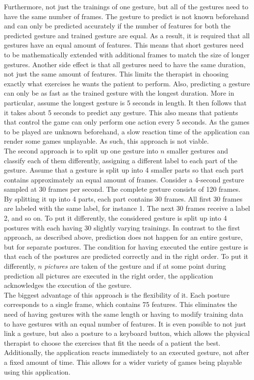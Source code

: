 Furthermore, not just the trainings of one gesture, but all of the gestures need to have the same number of frames. The gesture to predict is not known beforehand and can only be predicted accurately if the number of features for both the predicted gesture and trained gesture are equal. As a result, it is required that all gestures have an equal amount of features. This means that short gestures need to be mathematically extended with additional frames to match the size of longer gestures. Another side effect is that all gestures need to have the same duration, not just the same amount of features. This limits the therapist in choosing exactly what exercises he wants the patient to perform. Also, predicting a gesture can only be as fast as the trained gesture with the longest duration. More in particular, assume the longest gesture is 5 seconds in length. It then follows that it takes about 5 seconds to predict any gesture. This also means that patients that control the game can only perform one action every 5 seconds. As the games to be played are unknown beforehand, a slow reaction time of the application can render some games unplayable. As such, this approach is not viable.\\

The second approach is to split up one gesture into $n$ smaller gestures and classify each of them differently, assigning a different label to each part of the gesture. Assume that a gesture is split up into 4 smaller parts so that each part contains approximately an equal amount of frames. Consider a 4-second gesture sampled at 30 frames per second. The complete gesture consists of 120 frames. By splitting it up into 4 parts, each part contains 30 frames. All first 30 frames are labeled with the same label, for instance 1. The next 30 frames receive a label 2, and so on. To put it differently, the considered gesture is split up into 4 postures with each having 30 slightly varying trainings. In contrast to the first approach, as described above, prediction does not happen for an entire gesture, but for separate postures. The condition for having executed the entire gesture is that each of the postures are predicted correctly and in the right order. To put it differently, $n$ \emph{pictures} are taken of the gesture and if at some point during prediction all pictures are executed in the right order, the application acknowledges the execution of the gesture.\\

The biggest advantage of this approach is the flexibility of it. Each posture corresponds to a single frame, which contains 75 features. This eliminates the need of having gestures with the same length or having to modify training data to have gestures with an equal number of features. It is even possible to not just link a gesture, but also a posture to a keyboard button, which allows the physical therapist to choose the exercises that fit the needs of a patient the best. Additionally, the application reacts immediately to an executed gesture, not after a fixed amount of time. This allows for a wider variety of games being playable using this application.\\

